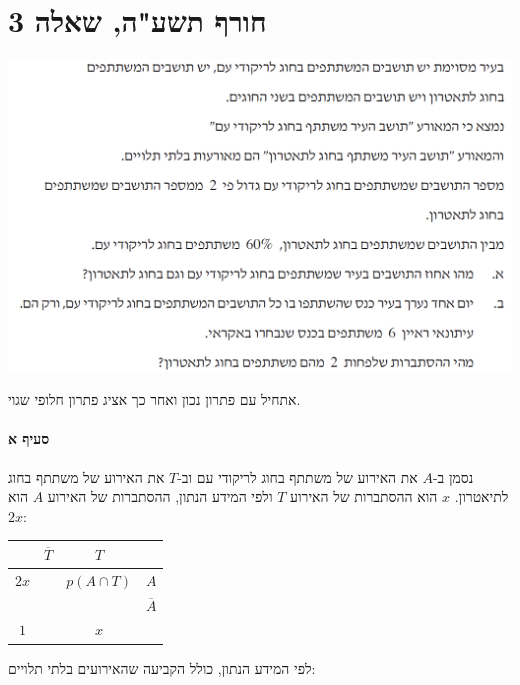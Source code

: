 \documentclass[12pt,a4paper]{article}
\begin{document}
\newpage


\section*{חורף תשע"ה, שאלה 3}

\begin{center}
\includegraphics[width=.8\textwidth]{winter-2014-3}
\end{center}

אתחיל עם פתרון נכון ואחר כך אציג פתרון חלופי שגוי.

\bigskip

\textbf{}

\vspace{-2ex}\paragraph{סעיף א}

נסמן ב-$A$ את האירוע של משתתף בחוג לריקודי עם וב-$T$ את האירוע של משתתף בחוג לתיאטרון. $x$ הוא ההסתברות של האירוע $T$ ולפי המידע הנתון, ההסתברות של האירוע $A$ הוא $2x$:


\begin{center}
\renewcommand{\arraystretch}{1.2}
\setlength{\tabcolsep}{12pt}
\begin{tabular}{|c|c|c|c|}
\hline
&$\overline{T}$&$T$&\\\hline
$2x$&&$p(A\cap T)$&$A$\\\hline
&&&$\overline{A}$\\\hline
$1$&&$x$&\\\hline
\end{tabular}
\end{center}

לפי המידע הנתון, כולל הקביעה שהאירועים בלתי תלויים:
\end{document}
